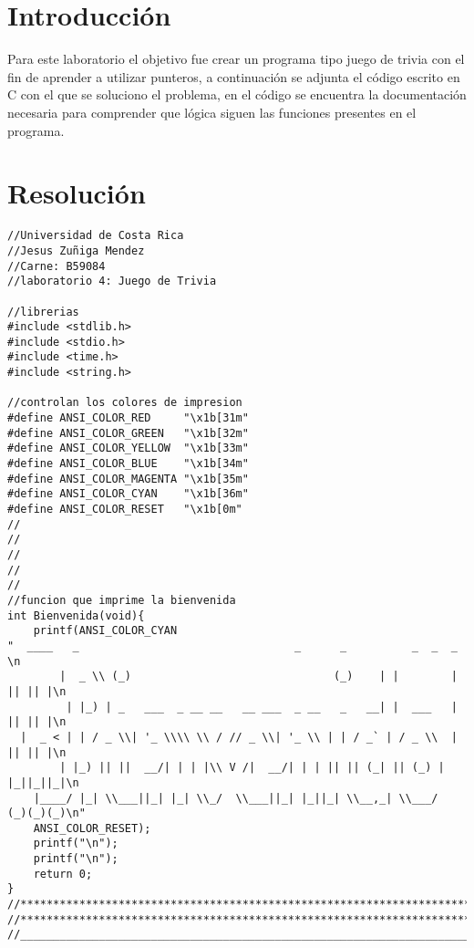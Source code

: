 \tableofcontents
\listoffigures
\newpage
\section{Introducción}
Para este laboratorio el objetivo fue crear un programa tipo juego de trivia con el fin de aprender a utilizar punteros, a continuación se adjunta el código escrito en C con el que se  soluciono el problema, en el código se encuentra la documentación necesaria para comprender que lógica siguen las funciones presentes en el programa.
\newpage
\section{Resolución}

\begin{verbatim} 
//Universidad de Costa Rica
//Jesus Zuñiga Mendez
//Carne: B59084
//laboratorio 4: Juego de Trivia

//librerias
#include <stdlib.h>
#include <stdio.h>
#include <time.h>
#include <string.h>

//controlan los colores de impresion
#define ANSI_COLOR_RED     "\x1b[31m"
#define ANSI_COLOR_GREEN   "\x1b[32m"
#define ANSI_COLOR_YELLOW  "\x1b[33m"
#define ANSI_COLOR_BLUE    "\x1b[34m"
#define ANSI_COLOR_MAGENTA "\x1b[35m"
#define ANSI_COLOR_CYAN    "\x1b[36m"
#define ANSI_COLOR_RESET   "\x1b[0m"
//
//
//
//
//
//funcion que imprime la bienvenida
int Bienvenida(void){
    printf(ANSI_COLOR_CYAN 
"  ____   _                                 _      _          _  _  _ \n
        |  _ \\ (_)                               (_)    | |        | || || |\n
         | |_) | _   ___  _ __ __   __ ___  _ __   _   __| |  ___   | || || |\n
  |  _ < | | / _ \\| '_ \\\\ \\ / // _ \\| '_ \\ | | / _` | / _ \\  | || || |\n
        | |_) || ||  __/| | | |\\ V /|  __/| | | || || (_| || (_) | |_||_||_|\n
    |____/ |_| \\___||_| |_| \\_/  \\___||_| |_||_| \\__,_| \\___/  (_)(_)(_)\n" 
    ANSI_COLOR_RESET);                                                                   
    printf("\n");
    printf("\n");
    return 0;
}
//*************************************************************************************
//*************************************************************************************
//_____________________________________________________________________________________


\end{verbatim}
